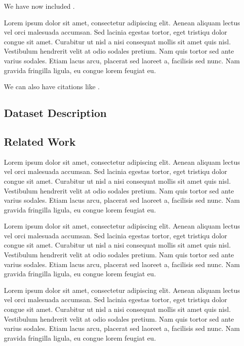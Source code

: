 We have now included .



Lorem ipsum dolor sit amet, consectetur adipiscing elit. Aenean aliquam lectus vel orci malesuada accumsan. Sed lacinia egestas tortor, eget tristiqu dolor congue sit amet. Curabitur ut nisl a nisi consequat mollis sit amet quis nisl. Vestibulum hendrerit velit at odio sodales pretium. Nam quis tortor sed ante varius sodales. Etiam lacus arcu, placerat sed laoreet a, facilisis sed nunc. Nam gravida fringilla ligula, eu congue lorem feugiat eu.

We can also have citations like \cite{iso-odf}.

\subsection{Dataset Description}
\label{sub-sec:dataset-desc}


\subsection{Related Work}

Lorem ipsum dolor sit amet, consectetur adipiscing elit. Aenean aliquam lectus vel orci malesuada accumsan. Sed lacinia egestas tortor, eget tristiqu dolor congue sit amet. Curabitur ut nisl a nisi consequat mollis sit amet quis nisl. Vestibulum hendrerit velit at odio sodales pretium. Nam quis tortor sed ante varius sodales. Etiam lacus arcu, placerat sed laoreet a, facilisis sed nunc. Nam gravida fringilla ligula, eu congue lorem feugiat eu.


Lorem ipsum dolor sit amet, consectetur adipiscing elit. Aenean aliquam lectus vel orci malesuada accumsan. Sed lacinia egestas tortor, eget tristiqu dolor congue sit amet. Curabitur ut nisl a nisi consequat mollis sit amet quis nisl. Vestibulum hendrerit velit at odio sodales pretium. Nam quis tortor sed ante varius sodales. Etiam lacus arcu, placerat sed laoreet a, facilisis sed nunc. Nam gravida fringilla ligula, eu congue lorem feugiat eu.


Lorem ipsum dolor sit amet, consectetur adipiscing elit. Aenean aliquam lectus vel orci malesuada accumsan. Sed lacinia egestas tortor, eget tristiqu dolor congue sit amet. Curabitur ut nisl a nisi consequat mollis sit amet quis nisl. Vestibulum hendrerit velit at odio sodales pretium. Nam quis tortor sed ante varius sodales. Etiam lacus arcu, placerat sed laoreet a, facilisis sed nunc. Nam gravida fringilla ligula, eu congue lorem feugiat eu.

